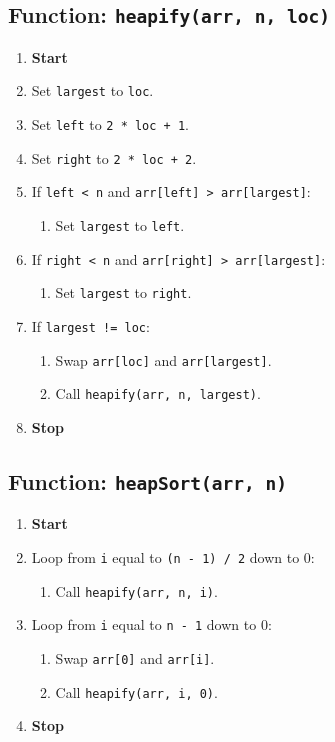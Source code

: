 {  \subsection{Function: \texttt{heapify(arr, n, loc)}}
  \begin{enumerate}[label*=\arabic*.]
    \item \textbf{Start}
    \item Set \texttt{largest} to \texttt{loc}.
    \item Set \texttt{left} to \texttt{2 * loc + 1}.
    \item Set \texttt{right} to \texttt{2 * loc + 2}.
    \item If \texttt{left < n} and \texttt{arr[left] > arr[largest]}:
          \begin{enumerate}[label*=\arabic*.]
            \item Set \texttt{largest} to \texttt{left}.
          \end{enumerate}
    \item If \texttt{right < n} and \texttt{arr[right] > arr[largest]}:
          \begin{enumerate}[label*=\arabic*.]
            \item Set \texttt{largest} to \texttt{right}.
          \end{enumerate}
    \item If \texttt{largest != loc}:
          \begin{enumerate}[label*=\arabic*.]
            \item Swap \texttt{arr[loc]} and \texttt{arr[largest]}.
            \item Call \texttt{heapify(arr, n, largest)}.
          \end{enumerate}
    \item \textbf{Stop}
  \end{enumerate}

  \subsection{Function: \texttt{heapSort(arr, n)}}
  \begin{enumerate}[label*=\arabic*.]
    \item \textbf{Start}
    \item Loop from \texttt{i} equal to \texttt{(n - 1) / 2} down to 0:
          \begin{enumerate}[label*=\arabic*.]
            \item Call \texttt{heapify(arr, n, i)}.
          \end{enumerate}
    \item Loop from \texttt{i} equal to \texttt{n - 1} down to 0:
          \begin{enumerate}[label*=\arabic*.]
            \item Swap \texttt{arr[0]} and \texttt{arr[i]}.
            \item Call \texttt{heapify(arr, i, 0)}.
          \end{enumerate}
    \item \textbf{Stop}
  \end{enumerate}

}
